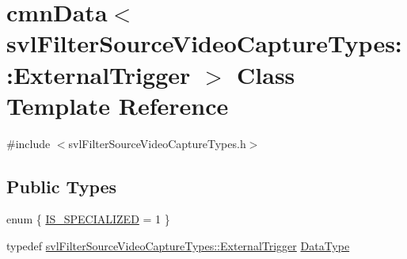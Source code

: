 \hypertarget{classcmn_data_3_01svl_filter_source_video_capture_types_1_1_external_trigger_01_4}{}\section{cmn\+Data$<$ svl\+Filter\+Source\+Video\+Capture\+Types\+:\+:External\+Trigger $>$ Class Template Reference}
\label{classcmn_data_3_01svl_filter_source_video_capture_types_1_1_external_trigger_01_4}


{\ttfamily \#include $<$svl\+Filter\+Source\+Video\+Capture\+Types.\+h$>$}

\subsection*{Public Types}
\begin{DoxyCompactItemize}
\item 
enum \{ \hyperlink{classcmn_data_3_01svl_filter_source_video_capture_types_1_1_external_trigger_01_4_a0e9d4919cc13d1fe880ab5f1aa0b385badc3c140213120ad9726d550daf5993a7}{I\+S\+\_\+\+S\+P\+E\+C\+I\+A\+L\+I\+Z\+E\+D} = 1
 \}
\item 
typedef \hyperlink{classsvl_filter_source_video_capture_types_1_1_external_trigger}{svl\+Filter\+Source\+Video\+Capture\+Types\+::\+External\+Trigger} \hyperlink{classcmn_data_3_01svl_filter_source_video_capture_types_1_1_external_trigger_01_4_a40012c3eec7676d2b0252443ae621472}{Data\+Type}
\end{DoxyCompactItemize}
